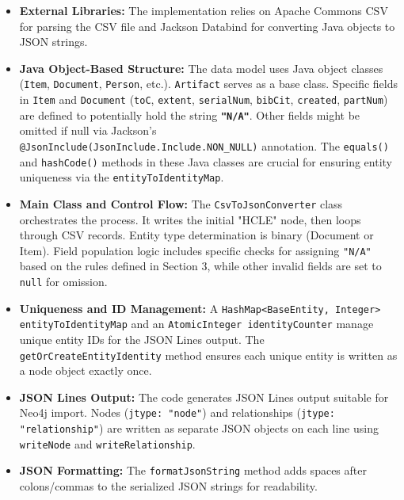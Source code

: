\begin{itemize}
    \item \textbf{External Libraries:} The implementation relies on Apache Commons CSV for parsing the CSV file and Jackson Databind for converting Java objects to JSON strings.

    \item \textbf{Java Object-Based Structure:} The data model uses Java object classes (\texttt{Item}, \texttt{Document}, \texttt{Person}, etc.). \texttt{Artifact} serves as a base class. Specific fields in \texttt{Item} and \texttt{Document} (\texttt{toC}, \texttt{extent}, \texttt{serialNum}, \texttt{bibCit}, \texttt{created}, \texttt{partNum}) are defined to potentially hold the string \textbf{\texttt{"N/A"}}. Other fields might be omitted if null via Jackson's \\
    \texttt{@JsonInclude(JsonInclude.Include.NON\_NULL)} annotation. The \texttt{equals()} and \texttt{hashCode()} methods in these Java classes are crucial for ensuring entity uniqueness via the \texttt{entityToIdentityMap}.

    \item \textbf{Main Class and Control Flow:} The \texttt{CsvToJsonConverter} class orchestrates the process. It writes the initial "HCLE" node, then loops through CSV records. Entity type determination is binary (Document or Item). Field population logic includes specific checks for assigning \texttt{"N/A"} based on the rules defined in Section 3, while other invalid fields are set to \texttt{null} for omission.

    \item \textbf{Uniqueness and ID Management:} A \texttt{HashMap<BaseEntity, Integer> entityToIdentityMap} and an \texttt{AtomicInteger identityCounter} manage unique entity IDs for the JSON Lines output. The \texttt{getOrCreateEntityIdentity} method ensures each unique entity is written as a node object exactly once.

    \item \textbf{JSON Lines Output:} The code generates JSON Lines output suitable for Neo4j import. Nodes (\texttt{jtype: "node"}) and relationships (\texttt{jtype: "relationship"}) are written as separate JSON objects on each line using \texttt{writeNode} and \texttt{writeRelationship}.

    \item \textbf{JSON Formatting:} The \texttt{formatJsonString} method adds spaces after colons/commas to the serialized JSON strings for readability.


\end{itemize}

